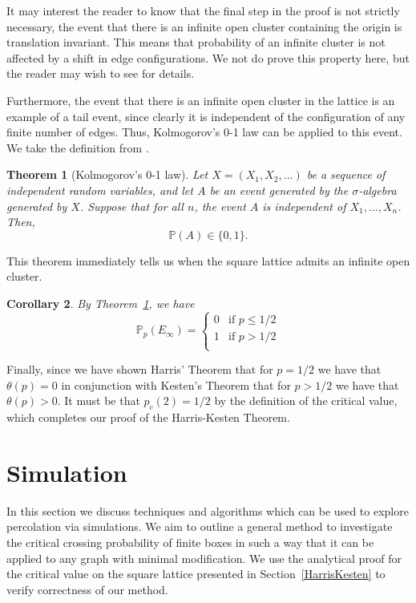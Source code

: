 \documentclass[a4paper,11pt]{article}
\newtheorem{theorem}{Theorem}[section]
\newtheorem{corollary}[theorem]{Corollary}
\theoremstyle{definition}
\newcommand{\sigalg}{$\sigma$-algebra }
\newcommand{\prob}{\mathbb{P}_p}
\begin{document}
It may interest the reader to know that the final step in the proof is not strictly necessary, the event that there is an infinite open cluster containing the origin is translation invariant. This means that probability of an infinite cluster is not affected by a shift in edge configurations. We not do prove this property here, but the reader may wish to see \cite{duminil2018introduction} for details. 

Furthermore, the event that there is an infinite open cluster in the lattice is an example of a tail event, since clearly it is independent of the configuration of any finite number of edges. Thus, Kolmogorov's 0-1 law can be applied to this event. We take the definition from \cite{bollo2006}.
\begin{theorem}[Kolmogorov's 0-1 law]\label{01Law}
	Let $X = (X_1,X_2,...)$ be a sequence of independent random variables, and let $A$ be an event generated by the \sigalg generated by $X$. Suppose that for all $n$, the event $A$ is independent of $X_1,...,X_n$. Then, $$\mathbb{P}(A) \in \{0,1\}.$$
\end{theorem}
This theorem immediately tells us when the square lattice admits an infinite open cluster. 

\begin{corollary}
	By Theorem~\ref*{01Law}, we have 
	$$\prob(E_{\infty}) = \begin{cases}
		0 & \text{if }p \leq 1/2\\
		1 & \text{if }p > 1/2\\
	\end{cases} $$
\end{corollary}

Finally, since we have shown Harris' Theorem that for $p=1/2$ we have that $\theta(p) =0$ in conjunction with Kesten's Theorem that for $p>1/2$ we have that $\theta(p) >0$. It must be that $p_c(2) = 1/2$ by the definition of the critical value, which completes our proof of the Harris-Kesten Theorem.


\section{Simulation}
In this section we discuss techniques and algorithms which can be used to explore percolation via simulations. We aim to outline a general method to investigate the critical crossing probability of finite boxes in such a way that it can be applied to any graph with minimal modification. We use the analytical proof for the critical value on the square lattice presented in Section~\ref*{HarrisKesten} to verify correctness of our method.
\end{document}
